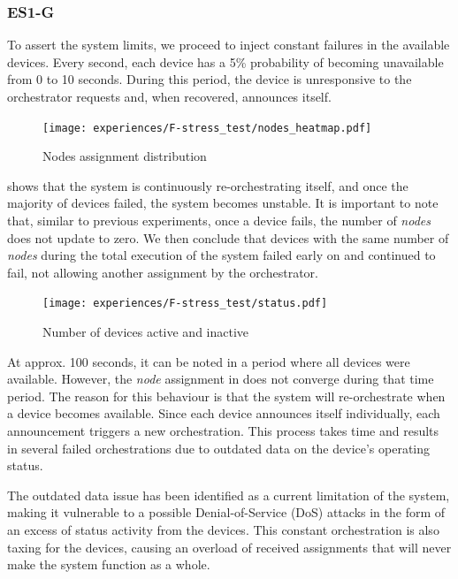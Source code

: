 
\subsubsection{ES1-G}\label{sec:experiment_f}

To assert the system limits, we proceed to inject constant failures in the available devices. Every second, each device has a 5\% probability of becoming unavailable from 0 to 10 seconds. During this period, the device is unresponsive to the orchestrator requests and, when recovered, announces itself.

\begin{figure}[h]
    \centering
    \texttt{[image: experiences/F-stress\_test/nodes\_heatmap.pdf]}
    \caption[Nodes assignment distribution]{Nodes assignment distribution}\label{fig:stress_test_nodes}
\end{figure}

 shows that the system is continuously re-orchestrating itself, and once the majority of devices failed, the system becomes unstable. It is important to note that, similar to previous experiments, once a device fails, the number of \textit{nodes} does not update to zero. We then conclude that devices with the same number of \textit{nodes} during the total execution of the system failed early on and continued to fail, not allowing another assignment by the orchestrator.

\begin{figure}[H]
\centering
\texttt{[image: experiences/F-stress\_test/status.pdf]}
\caption[Number of devices active and inactive]{Number of devices active and inactive}\label{fig:stress_test_status}
\end{figure}

At approx. 100 seconds, it can be noted in  a period where all devices were available. However, the \textit{node} assignment in  does not converge during that time period. The reason for this behaviour is that the system will re-orchestrate when a device becomes available. Since each device announces itself individually, each announcement triggers a new orchestration. This process takes time and results in several failed orchestrations due to outdated data on the device's operating status. 

The outdated data issue has been identified as a current limitation of the system, making it vulnerable to a possible Denial-of-Service (DoS) attacks in the form of an excess of status activity from the devices. This constant orchestration is also taxing for the devices, causing an overload of received assignments that will never make the system function as a whole.

